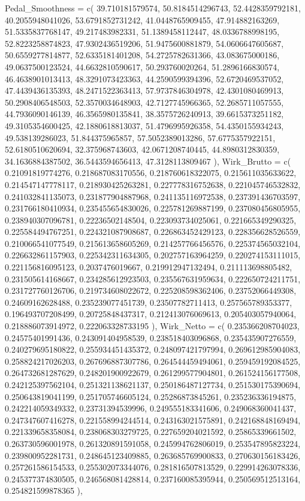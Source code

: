 \documentclass[
  letterpaper,
  DIV=11]{scrartcl}
\newenvironment{Shaded}{\begin{snugshade}}{\end{snugshade}}
\newcommand{\NormalTok}[1]{\textcolor[rgb]{0.00,0.23,0.31}{#1}}
\begin{document}
\begin{Shaded}
\begin{Highlighting}[]
\NormalTok{  \textasciigrave{}Pedal\_Smoothness\textasciigrave{} = c( 39.710181579574, 50.8184514296743, 52.4428359792181, 40.2055948041026, 53.6791852731242, 41.0448765909455, 47.914882163269, 51.5335837768147, 49.217483982331, 51.1389458112447, 48.0336788998195, 52.8223258874823, 47.9302436519206, 51.9475600881879, 54.0606647605687, 50.6559277814877, 52.6335181401208, 54.2725782631366, 43.083675000186, 49.0637500123524, 44.6632810590617, 50.293760020264, 51.2896166830574, 46.4638901013413, 48.3291073423363, 44.2590599394396, 52.6720469537052, 47.4439436135393, 48.2471522363413, 57.9737846304978, 42.4301080469913, 50.2908406548503, 52.3570034648903, 42.7127745966365, 52.2685711057555, 44.7936090146139, 46.3565980135841, 38.3575726240913, 39.6615373251182, 49.3105354600425, 42.1880618813037, 51.4796995926358, 54.4350155934243, 49.538139286023, 51.844375965857, 57.5052389013286, 57.6775357922151, 52.6180510620694, 32.375968743603, 42.0671208740445, 44.8980312830359, 34.1636884387502, 36.5443594656413, 47.3128113809467 ),}
\NormalTok{  \textasciigrave{}Wirk\_Brutto\textasciigrave{} = c( 0.21091819774276, 0.218687083170556, 0.218760618322075, 0.215611035633622, 0.214547147778117, 0.218930425263281, 0.227778316752638, 0.221045746532832, 0.241032841135073, 0.231877904887968, 0.241135116972538, 0.237391436703597, 0.231766180410934, 0.235455654830026, 0.225781269887199, 0.237080456805955, 0.238940307096781, 0.22236502148504, 0.223093734025061, 0.221665349290325, 0.225584494767251, 0.224321087908687, 0.226863452429123, 0.228356628526559, 0.210066541077549, 0.215613658605269, 0.214257766456576, 0.225374565032104, 0.226632861157903, 0.225342311634305, 0.202757163964259, 0.220274153111015, 0.221156816095123, 0.2037476019667, 0.219912947132494, 0.211113698805482, 0.231505614168667, 0.234285612923503, 0.235567631959634, 0.222650724211751, 0.231727760126706, 0.219734608022672, 0.225208598362406, 0.23752066449308, 0.24609162628488, 0.235239077451739, 0.23507782711413, 0.257565789353377, 0.196493707208499, 0.20725848437317, 0.212413076069613, 0.205403057940064, 0.218886073914972, 0.222063328733195 ),}
\NormalTok{  \textasciigrave{}Wirk\_Netto\textasciigrave{} = c( 0.235366208704023, 0.24575401991436, 0.243091404958539, 0.238518403096868, 0.235435907276559, 0.240279695180822, 0.255934451435372, 0.248097421797994, 0.269612985904083, 0.258824217026203, 0.267696887307786, 0.264544459494061, 0.259459192084525, 0.264732681287629, 0.248201900922679, 0.261299577904801, 0.261524156177508, 0.242125397562104, 0.251321138621137, 0.250186487127734, 0.251530175390694, 0.250643819041199, 0.251705746605124, 0.25286873845261, 0.235236336194875, 0.242214059349332, 0.23731394539996, 0.249555183341606, 0.249068360041437, 0.247347607416278, 0.221558994244514, 0.243163021575891, 0.242168848169494, 0.221339658358084, 0.238068303279725, 0.227659204021592, 0.25865339661502, 0.263730596001978, 0.261320891591058, 0.245994762806019, 0.253547895823224, 0.239800952281731, 0.248645123409885, 0.263685769900833, 0.270630156183426, 0.257261586154533, 0.255302073344076, 0.281816507813529, 0.229914263078336, 0.245377374830505, 0.246568081428814, 0.237160085395944, 0.250569512513164, 0.254821599878365 ),}

\end{Highlighting}
\end{Shaded}
\end{document}
